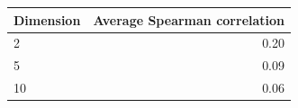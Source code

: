\begin{tabular}{lr}
\toprule
Dimension & Average Spearman correlation \\
\midrule
2 & 0.20 \\
5 & 0.09 \\
10 & 0.06 \\
\bottomrule
\end{tabular}
